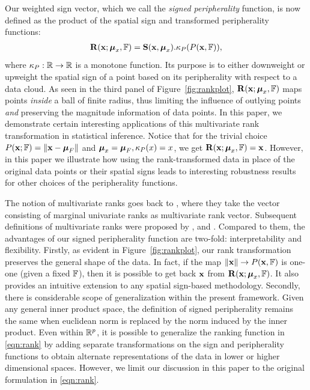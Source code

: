 Our weighted sign vector, which we call the {\it signed peripherality} function, is now defined as the product of the spatial sign and transformed peripherality functions:
%
\begin{align}\label{eqn:rank}
{\mathbf{R}} ({\bf{x}}; {\boldsymbol{\mu}}_x, {\mathbb{F}}) = {\mathbf{S}}({\bf{x}}, {\boldsymbol{\mu}}_x). \kappa_P( P({\bf{x}}, {\mathbb{F}})),
\end{align}
%
where $\kappa_P: {\mathbb{R}} \rightarrow {\mathbb{R}}$ is a monotone function. Its purpose is to either downweight or upweight the spatial sign of a point based on its peripherality with respect to a data cloud. As seen in the third panel of Figure~\ref{fig:rankplot}, ${\mathbf{R}} ({\bf{x}}; {\boldsymbol{\mu}}_x, {\mathbb{F}})$ maps points {\it inside} a ball of finite radius, thus limiting the influence of outlying points {\it and} preserving the magnitude information of data points. In this paper, we demonstrate certain interesting applications of this multivariate rank transformation in statistical inference. Notice that for the trivial choice $P( {\bf{x}}; {\mathbb{F}}) = \| {\bf{x}} - {\boldsymbol{\mu}}_{F} \|$ and ${\boldsymbol{\mu}}_x = {\boldsymbol{\mu}}_F, \kappa_P(x)=x$, we get ${\mathbf{R}} ({\bf{x}}; {\boldsymbol{\mu}}_x, {\mathbb{F}}) = {\bf{x}}$. However, in this paper we illustrate how using the rank-transformed data in place of the original data points or their spatial signs leads to interesting robustness results for other choices of the peripherality functions.

The notion of multivariate ranks goes back to \cite{PuriSenBook}, where they take the vector consisting of marginal univariate ranks as multivariate rank vector. Subsequent definitions of multivariate ranks were proposed by \cite{MottonenOja95}, \cite{HallinPaindaveine02} and \cite{Chernozhukov17}. Compared to them, the advantages of our signed peripherality function are two-fold: interpretability and flexibility. Firstly, as evident in Figure~\ref{fig:rankplot}, our rank transformation preserves the general shape of the data. In fact, if the map $\| {\bf{x}} \| \rightarrow P({\bf{x}}, {\mathbb{F}})$ is one-one (given a fixed ${\mathbb{F}}$), then it is possible to get back ${\bf{x}}$ from ${\mathbf{R}} ({\bf{x}}; {\boldsymbol{\mu}}_x, {\mathbb{F}})$. It also provides an intuitive extension to any spatial sign-based methodology. Secondly, there is considerable scope of generalization within the present framework. Given any general inner product space, the definition of signed peripherality remains the same when euclidean norm is replaced by the norm induced by the inner product. Even within ${\mathbb{R}}^p$, it is possible to generalize the ranking function in \eqref{eqn:rank} by adding separate transformations on the sign and peripherality functions to obtain alternate representations of the data in lower or higher dimensional spaces. However, we limit our discussion in this paper to the original formulation in \eqref{eqn:rank}.

